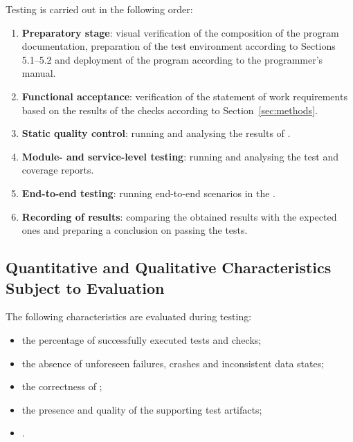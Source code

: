 \documentclass[12pt,a4paper]{extarticle}
\begin{document}
\begin{hseExample}
Testing is carried out in the following order:

\begin{enumerate}[label=\arabic*), leftmargin=1.25cm]
    \item \textbf{Preparatory stage}: visual verification of the composition of the program documentation, preparation of the test environment according to Sections 5.1--5.2 and deployment of the program according to the programmer's manual.
    \item \textbf{Functional acceptance}: verification of the statement of work requirements based on the results of the checks according to Section~\ref{sec:methods}.
    \item \textbf{Static quality control}: running and analysing the results of .
    \item \textbf{Module- and service-level testing}: running  and analysing the test and coverage reports.
    \item \textbf{End-to-end testing}: running end-to-end scenarios in the .
    \item \textbf{Recording of results}: comparing the obtained results with the expected ones and preparing a conclusion on passing the tests.
\end{enumerate}
\end{hseExample}

\subsection{Quantitative and Qualitative Characteristics Subject to Evaluation}

\begin{hseExample}
The following characteristics are evaluated during testing:

\begin{itemize}[leftmargin=1.25cm]
    \item the percentage of successfully executed tests and checks;
    \item the absence of unforeseen failures, crashes and inconsistent data states;
    \item the correctness of ;
    \item the presence and quality of the supporting test artifacts;
    \item {}.
\end{itemize}
\end{hseExample}
\end{document}
